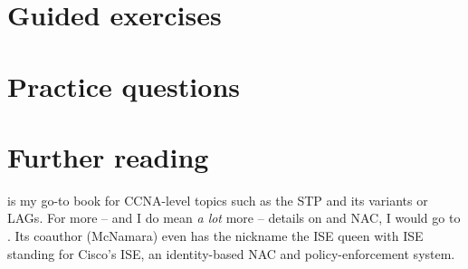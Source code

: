 \section{Guided exercises}
\label{sec:ethernet-guided-exercises}

\section{Practice questions}
\label{sec:ethernet-practice-questions}

\section{Further reading}
\textcite{lammle-ccna} is my go-to book for \acs{CCNA}-level topics such as the \acf{STP} and its variants or \acfp{LAG}.
For more -- and I do mean \emph{a lot} more -- details on  and \acf{NAC}, I would go to \textcite{woland}.
Its coauthor (McNamara) even has the nickname the \acs{ISE} queen with \acs{ISE} standing for Cisco's \acl{ISE}, an identity-based \acs{NAC} and policy-enforcement system.
